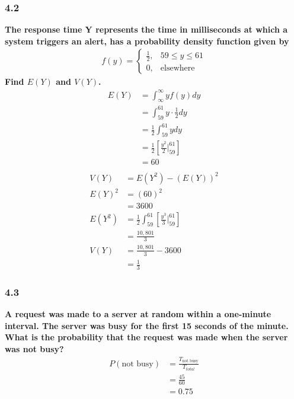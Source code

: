 \documentclass[
	a4paper, %
	10pt, %
	unnumberedsections, %
	twoside, %
]{LTJournalArticle}
\begin{document}
\subsubsection{4.2}
\textbf{The response time Y represents the time in milliseconds at which a system triggers an alert, has a probability density function given by}
\begin{equation*}
    \begin{aligned}
        f(y) =
        \begin{cases}
            \frac{1}{2}, & 59 \le y \le 61 \\
            0, & \text{elsewhere}
        \end{cases}
    \end{aligned}
\end{equation*}
\textbf{Find $E(Y)$ and $V(Y)$.}
\begin{equation*}
    \begin{aligned}
        E(Y) &= \int^\infty_\infty yf(y)dy \\
            &= \int^{61}_{59} y \cdot \frac{1}{2} dy \\
            &= \frac{1}{2} \int^{61}_{59} ydy \\
            &= \frac{1}{2} \left[ \frac{y^2}{2} \Biggr|^{61}_{59} \right] \\
            &= 60 \\
    \end{aligned}
\end{equation*}
\begin{equation*}
    \begin{aligned}
        V(Y) &= E(Y^2) - (E(Y))^2 \\
        E(Y)^2 &= (60)^2 \\
        &= 3600 \\
        E(Y^2) &= \frac{1}{2} \int^{61}_{59} \left[ \frac{y^3}{3} \Biggr|^{61}_{59} \right] \\
        &= \frac{10,801}{3} \\
        V(Y) &= \frac{10,801}{3} - 3600 \\
        &= \frac{1}{3}
    \end{aligned}
\end{equation*}
\vspace*{1pt}\noindent
\subsubsection{4.3}
\textbf{A request was made to a server at random within a one-minute interval. The server was busy for the first 15 seconds of the minute. What is the probability that the request was made when the server was not busy?}
\begin{equation*}
    \begin{aligned}
        P(\text{not busy}) &= \frac{T_{\text{not busy}}}{T_{total}} \\
        &= \frac{45}{60} \\
        &= 0.75
    \end{aligned}
\end{equation*}
\vspace*{1pt}\noindent
\end{document}
